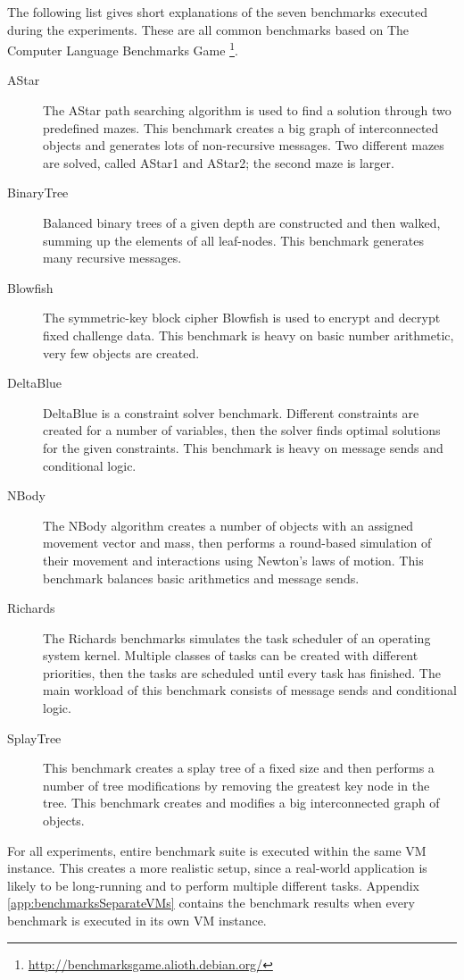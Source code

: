 The following list gives short explanations of the seven benchmarks executed during the experiments.
These are all common benchmarks based on The Computer Language Benchmarks Game \footnote{\url{http://benchmarksgame.alioth.debian.org/}}.
\begin{description}
\item[AStar]{The AStar path searching algorithm is used to find a solution through two predefined mazes. This benchmark creates a big graph of interconnected objects and generates lots of non-recursive messages. Two different mazes are solved, called AStar1 and AStar2; the second maze is larger.}
\item[BinaryTree]{Balanced binary trees of a given depth are constructed and then walked, summing up the elements of all leaf-nodes. This benchmark generates many recursive messages.}
\item[Blowfish]{The symmetric-key block cipher Blowfish is used to encrypt and decrypt fixed challenge data. This benchmark is heavy on basic number arithmetic, very few objects are created.}
\item[DeltaBlue]{DeltaBlue is a constraint solver benchmark. Different constraints are created for a number of variables, then the solver finds optimal solutions for the given constraints. This benchmark is heavy on message sends and conditional logic.}
\item[NBody]{The NBody algorithm creates a number of objects with an assigned movement vector and mass, then performs a round-based simulation of their movement and interactions using Newton's laws of motion. This benchmark balances basic arithmetics and message sends.}
\item[Richards]{The Richards benchmarks simulates the task scheduler of an operating system kernel. Multiple classes of tasks can be created with different priorities, then the tasks are scheduled until every task has finished. The main workload of this benchmark consists of message sends and conditional logic.}
\item[SplayTree]{This benchmark creates a splay tree of a fixed size and then performs a number of tree modifications by removing the greatest key node in the tree. This benchmark creates and modifies a big interconnected graph of objects.}
\end{description}

For all experiments, entire benchmark suite is executed within the same VM instance.
This creates a more realistic setup, since a real-world application is likely to be long-running and to perform multiple different tasks.
Appendix \ref{app:benchmarksSeparateVMs} contains the benchmark results when every benchmark is executed in its own VM instance.


